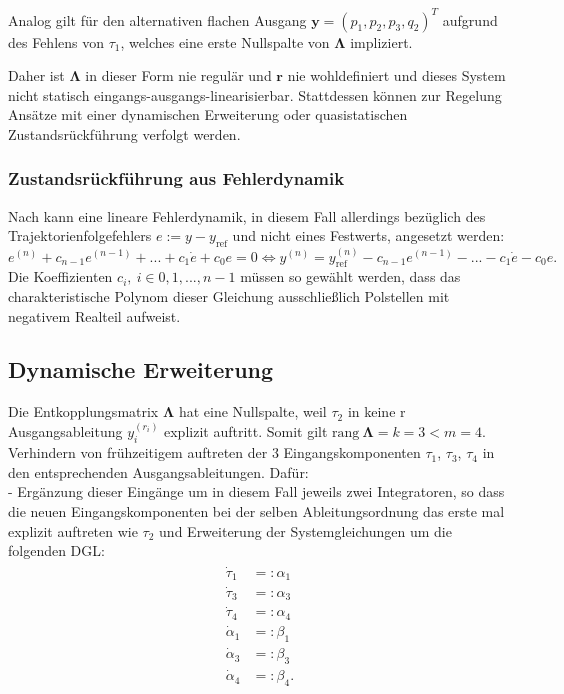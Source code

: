 Analog gilt für den alternativen flachen Ausgang $\pmb{y} = (p_1, p_2, p_3, q_2)^T$ aufgrund des Fehlens von $\tau_1$, welches eine erste Nullspalte von $\pmb{\Lambda}$ impliziert.

Daher ist $\pmb{\Lambda}$ in dieser Form nie regulär und $\pmb{r}$ nie wohldefiniert und dieses System nicht statisch eingangs-ausgangs-linearisierbar. 
Stattdessen können zur Regelung Ansätze mit einer dynamischen Erweiterung oder quasistatischen Zustandsrückführung verfolgt werden. 

\subsubsection{Zustandsrückführung aus Fehlerdynamik}
Nach \cite[S. 195]{NLRT_Roebenack} kann eine lineare Fehlerdynamik, in diesem Fall allerdings bezüglich des Trajektorienfolgefehlers $e := y - y_{\text{ref}}$ und nicht eines Festwerts, angesetzt werden:
\begin{equation}
	e^{(n)} + c_{n-1} e^{(n-1)} + ... + c_{1} \dot{e} + c_{0} e = 0 
	\Leftrightarrow y^{(n)} = y_{\text{ref}}^{(n)} - c_{n-1} e^{(n-1)} - ... - c_{1} \dot{e} - c_{0} e .
\end{equation}
Die Koeffizienten $c_i, \ i \in {0, 1, ..., n-1}$ müssen so gewählt werden, dass das charakteristische Polynom dieser Gleichung ausschließlich Polstellen mit negativem Realteil aufweist.

\subsection{Dynamische Erweiterung}
Die Entkopplungsmatrix $\pmb{\Lambda}$ hat eine Nullspalte, weil $\tau_2$ in keine r Ausgangsableitung $y_i^{(r_i)}$ explizit auftritt. Somit gilt $\text{rang} \ \pmb{\Lambda} = k = 3 < m = 4$. \\

Verhindern von frühzeitigem auftreten der 3 Eingangskomponenten $\tau_1$, $\tau_3$, $\tau_4$ in den entsprechenden Ausgangsableitungen. Dafür: \\
- Ergänzung dieser Eingänge um  in diesem Fall jeweils zwei Integratoren, so dass die neuen Eingangskomponenten bei der selben Ableitungsordnung das erste mal explizit auftreten wie $\tau_2$ und Erweiterung der Systemgleichungen um die folgenden DGL:
\begin{align}
	\begin{split}
		\dot{\tau}_1 &=: \alpha_1 \\
		\dot{\tau}_3 &=: \alpha_3 \\
		\dot{\tau}_4 &=: \alpha_4 \\
		\dot{\alpha}_1 &=: \beta_1 \\
		\dot{\alpha}_3 &=: \beta_3 \\
		\dot{\alpha}_4 &=: \beta_4 .
	\end{split}
\end{align}

